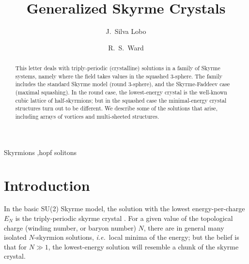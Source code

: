 \documentclass[5p]{elsarticle}
\begin{document}

\begin{frontmatter}

\title{Generalized Skyrme Crystals}

\author[dur]{J.\ Silva Lobo}

\author[dur]{R.\ S.\ Ward}  


\address[dur]{Department of Mathematical Sciences, Durham University, South Road, Durham, DH1 3LE, United Kingdom}

\begin{abstract}
This letter deals with triply-periodic (crystalline) solutions
in a family of Skyrme systems, namely where the field takes values in the
squashed 3-sphere. The family includes the standard Skyrme model
(round 3-sphere), and the Skyrme-Faddeev case (maximal squashing).
In the round case, the lowest-energy crystal is the well-known cubic
lattice of half-skyrmions; but in the squashed case the minimal-energy
crystal structures turn out to be different. We describe some of the
solutions that arise, including arrays of vortices and multi-sheeted
structures.
\end{abstract}

\begin{keyword}
Skyrmions \sep hopf solitons
\end{keyword}

\end{frontmatter}




\section{Introduction}

In the basic SU(2) Skyrme model, the solution with the lowest energy-per-charge
$E_N$ is the triply-periodic skyrme crystal \cite{MS04}. For a given value of
the topological charge (winding number, or baryon number) $N$, there are in
general many isolated $N$-skyrmion solutions, {\sl i.e.}\ local
minima of the energy; but the belief is that for $N\gg1$, the
lowest-energy solution will resemble a chunk of the skyrme crystal.
\end{document}
